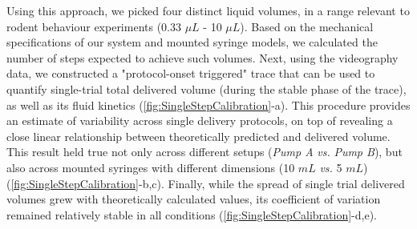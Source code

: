 Using this approach, we picked four distinct liquid volumes, in a range relevant to rodent behaviour experiments (0.33 $\mu L$ - 10 $\mu L$). Based on the mechanical specifications of our system and mounted syringe models, we calculated the number of steps expected to achieve such volumes. Next, using the videography data, we constructed a "protocol-onset triggered" trace that can be used to quantify single-trial total delivered volume (during the stable phase of the trace), as well as its fluid kinetics (\cref{fig:SingleStepCalibration}-a). This procedure provides an estimate of variability across single delivery protocols, on top of revealing a close linear relationship between theoretically predicted and delivered volume. This result held true not only across different setups (\textit{Pump A} \textit{vs.} \textit{Pump B}), but also across mounted syringes with different dimensions (10 $mL$ \textit{vs.} 5 $mL$) (\cref{fig:SingleStepCalibration}-b,c). Finally, while the spread of single trial delivered volumes grew with theoretically calculated values, its coefficient of variation remained relatively stable in all conditions (\cref{fig:SingleStepCalibration}-d,e).


